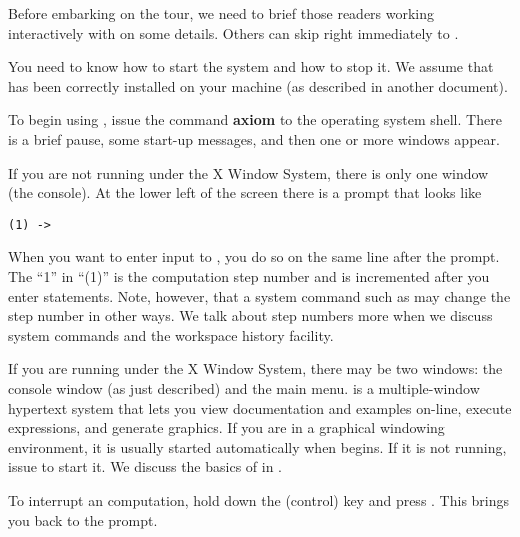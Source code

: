 Before embarking on the tour, we need to brief those readers
working interactively with \Language{} on some details.
Others can skip right immediately to
.

%

You need to know how to start the \Language{} system and how to stop it.
We assume that \Language{} has been correctly installed on your
machine (as described in another \Language{} document).

To begin using \Language{}, issue the command {\bf axiom} to the
operating system shell.
There is a brief pause, some start-up messages, and then one
or more windows appear.

If you are not running \Language{} under the X Window System, there is
only one window (the console).
At the lower left of the screen there is a prompt that
looks like
\begin{verbatim}
(1) ->
\end{verbatim}
When you want to enter input to \Language{}, you do so on the same line
after the prompt.
The ``1'' in ``(1)'' is the computation step number and is incremented
after you enter \Language{} statements.
Note, however, that a system command
such as 
may change the step number in other ways.
We talk about step numbers more when we discuss system commands
and the workspace history facility.

If you are running \Language{} under the X Window System, there may be two
windows: the console window (as just described) and the \HyperName{}
main menu.
\HyperName{} is a multiple-window hypertext system that lets you
view \Language{} documentation and examples on-line,
execute \Language{} expressions, and generate graphics.
If you are in a graphical windowing environment,
it is usually started automatically when \Language{} begins.
If it is not running, issue  to start it.
We discuss the basics of \HyperName{} in .

To interrupt an \Language{} computation, hold down the
 (control) key and press
.
This  brings you back to the \Language{} prompt.

